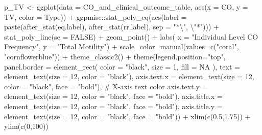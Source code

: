 \documentclass[
  letterpaper,
  DIV=11,
  numbers=noendperiod]{scrreprt}
\newenvironment{Shaded}{\begin{snugshade}}{\end{snugshade}}
\newcommand{\AttributeTok}[1]{\textcolor[rgb]{0.40,0.45,0.13}{#1}}
\newcommand{\CommentTok}[1]{\textcolor[rgb]{0.37,0.37,0.37}{#1}}
\newcommand{\ConstantTok}[1]{\textcolor[rgb]{0.56,0.35,0.01}{#1}}
\newcommand{\DecValTok}[1]{\textcolor[rgb]{0.68,0.00,0.00}{#1}}
\newcommand{\FloatTok}[1]{\textcolor[rgb]{0.68,0.00,0.00}{#1}}
\newcommand{\FunctionTok}[1]{\textcolor[rgb]{0.28,0.35,0.67}{#1}}
\newcommand{\NormalTok}[1]{\textcolor[rgb]{0.00,0.23,0.31}{#1}}
\newcommand{\OtherTok}[1]{\textcolor[rgb]{0.00,0.23,0.31}{#1}}
\newcommand{\SpecialCharTok}[1]{\textcolor[rgb]{0.37,0.37,0.37}{#1}}
\newcommand{\StringTok}[1]{\textcolor[rgb]{0.13,0.47,0.30}{#1}}
\begin{document}
\begin{codelisting}
\begin{Shaded}
\begin{Highlighting}[]
\NormalTok{p\_TV }\OtherTok{\textless{}{-}} \FunctionTok{ggplot}\NormalTok{(}\AttributeTok{data =}\NormalTok{ CO\_and\_clinical\_outcome\_table, }\FunctionTok{aes}\NormalTok{(}\AttributeTok{x =}\NormalTok{ CO, }\AttributeTok{y =}\NormalTok{ TV, }\AttributeTok{color =}\NormalTok{ Type)) }\SpecialCharTok{+}
\NormalTok{  ggpmisc}\SpecialCharTok{::}\FunctionTok{stat\_poly\_eq}\NormalTok{(}\FunctionTok{aes}\NormalTok{(}\AttributeTok{label =} \FunctionTok{paste}\NormalTok{(}\FunctionTok{after\_stat}\NormalTok{(eq.label),}
                               \FunctionTok{after\_stat}\NormalTok{(rr.label), }\AttributeTok{sep =} \StringTok{"*}\SpecialCharTok{\textbackslash{}"}\StringTok{, }\SpecialCharTok{\textbackslash{}"}\StringTok{*"}\NormalTok{))) }\SpecialCharTok{+}
  \FunctionTok{stat\_poly\_line}\NormalTok{(}\AttributeTok{se =} \ConstantTok{FALSE}\NormalTok{) }\SpecialCharTok{+}
  \FunctionTok{geom\_point}\NormalTok{() }\SpecialCharTok{+} 
  \FunctionTok{labs}\NormalTok{(}
       \AttributeTok{x =} \StringTok{"Individual Level CO Frequency"}\NormalTok{,}
       \AttributeTok{y =} \StringTok{"Total Motility"}\NormalTok{) }\SpecialCharTok{+}
  \FunctionTok{scale\_color\_manual}\NormalTok{(}\AttributeTok{values=}\FunctionTok{c}\NormalTok{(}\StringTok{"coral"}\NormalTok{, }\StringTok{"cornflowerblue"}\NormalTok{)) }\SpecialCharTok{+} \FunctionTok{theme\_classic2}\NormalTok{() }\SpecialCharTok{+}
  \FunctionTok{theme}\NormalTok{(}\AttributeTok{legend.position=}\StringTok{"top"}\NormalTok{,}
        \AttributeTok{panel.border =} \FunctionTok{element\_rect}\NormalTok{(}
          \AttributeTok{color =} \StringTok{"black"}\NormalTok{,}
          \AttributeTok{size =} \DecValTok{1}\NormalTok{,}
          \AttributeTok{fill =} \ConstantTok{NA}
\NormalTok{          ),}
        \AttributeTok{text =} \FunctionTok{element\_text}\NormalTok{(}\AttributeTok{size =} \DecValTok{12}\NormalTok{, }\AttributeTok{color =} \StringTok{"black"}\NormalTok{),}
        \AttributeTok{axis.text.x =} \FunctionTok{element\_text}\NormalTok{(}\AttributeTok{size =} \DecValTok{12}\NormalTok{, }\AttributeTok{color =} \StringTok{"black"}\NormalTok{, }\AttributeTok{face =} \StringTok{"bold"}\NormalTok{),  }\CommentTok{\# X{-}axis text color}
        \AttributeTok{axis.text.y =} \FunctionTok{element\_text}\NormalTok{(}\AttributeTok{size =} \DecValTok{12}\NormalTok{, }\AttributeTok{color =} \StringTok{"black"}\NormalTok{, }\AttributeTok{face =} \StringTok{"bold"}\NormalTok{),}
        \AttributeTok{axis.title.x =} \FunctionTok{element\_text}\NormalTok{(}\AttributeTok{size =} \DecValTok{12}\NormalTok{, }\AttributeTok{color =} \StringTok{"black"}\NormalTok{, }\AttributeTok{face =} \StringTok{"bold"}\NormalTok{),}
        \AttributeTok{axis.title.y =} \FunctionTok{element\_text}\NormalTok{(}\AttributeTok{size =} \DecValTok{12}\NormalTok{, }\AttributeTok{color =} \StringTok{"black"}\NormalTok{, }\AttributeTok{face =} \StringTok{"bold"}\NormalTok{)) }\SpecialCharTok{+} 
  \FunctionTok{xlim}\NormalTok{(}\FunctionTok{c}\NormalTok{(}\FloatTok{0.5}\NormalTok{,}\FloatTok{1.75}\NormalTok{)) }\SpecialCharTok{+}
  \FunctionTok{ylim}\NormalTok{(}\FunctionTok{c}\NormalTok{(}\DecValTok{0}\NormalTok{,}\DecValTok{100}\NormalTok{))}


\end{Highlighting}
\end{Shaded}
\end{codelisting}
\end{document}
